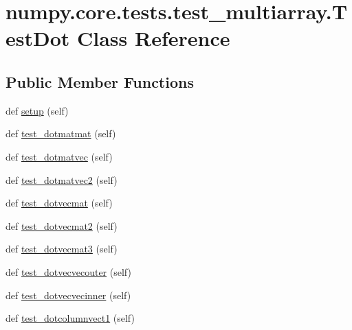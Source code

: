 \hypertarget{classnumpy_1_1core_1_1tests_1_1test__multiarray_1_1TestDot}{}\section{numpy.\+core.\+tests.\+test\+\_\+multiarray.\+Test\+Dot Class Reference}
\label{classnumpy_1_1core_1_1tests_1_1test__multiarray_1_1TestDot}
\subsection*{Public Member Functions}
\begin{DoxyCompactItemize}
\item 
def \hyperlink{classnumpy_1_1core_1_1tests_1_1test__multiarray_1_1TestDot_aa0f474d3d3e96eeee9b175a3a1cf21c1}{setup} (self)
\item 
def \hyperlink{classnumpy_1_1core_1_1tests_1_1test__multiarray_1_1TestDot_a3d7a7b7cc06560b78efe1a8d7c624e8c}{test\+\_\+dotmatmat} (self)
\item 
def \hyperlink{classnumpy_1_1core_1_1tests_1_1test__multiarray_1_1TestDot_afc061136b497f55076ba3c041c19f1a5}{test\+\_\+dotmatvec} (self)
\item 
def \hyperlink{classnumpy_1_1core_1_1tests_1_1test__multiarray_1_1TestDot_acbf0965d9726621f8a60b254a9854595}{test\+\_\+dotmatvec2} (self)
\item 
def \hyperlink{classnumpy_1_1core_1_1tests_1_1test__multiarray_1_1TestDot_a4a3c5f30eccaa193603070999bb52f01}{test\+\_\+dotvecmat} (self)
\item 
def \hyperlink{classnumpy_1_1core_1_1tests_1_1test__multiarray_1_1TestDot_a45a2c7ee8b7a2f2546ec13bfbf7eedc0}{test\+\_\+dotvecmat2} (self)
\item 
def \hyperlink{classnumpy_1_1core_1_1tests_1_1test__multiarray_1_1TestDot_a10bd803410235ac2e58d2eb4dd4d6f1d}{test\+\_\+dotvecmat3} (self)
\item 
def \hyperlink{classnumpy_1_1core_1_1tests_1_1test__multiarray_1_1TestDot_a8210d13631449f78f2007324bac45250}{test\+\_\+dotvecvecouter} (self)
\item 
def \hyperlink{classnumpy_1_1core_1_1tests_1_1test__multiarray_1_1TestDot_ab0679c4181c7f241b0593d19af603c51}{test\+\_\+dotvecvecinner} (self)
\item 
def \hyperlink{classnumpy_1_1core_1_1tests_1_1test__multiarray_1_1TestDot_a4958a8784fa030ad15b485fae08bf4fc}{test\+\_\+dotcolumnvect1} (self)

\end{DoxyCompactItemize}
